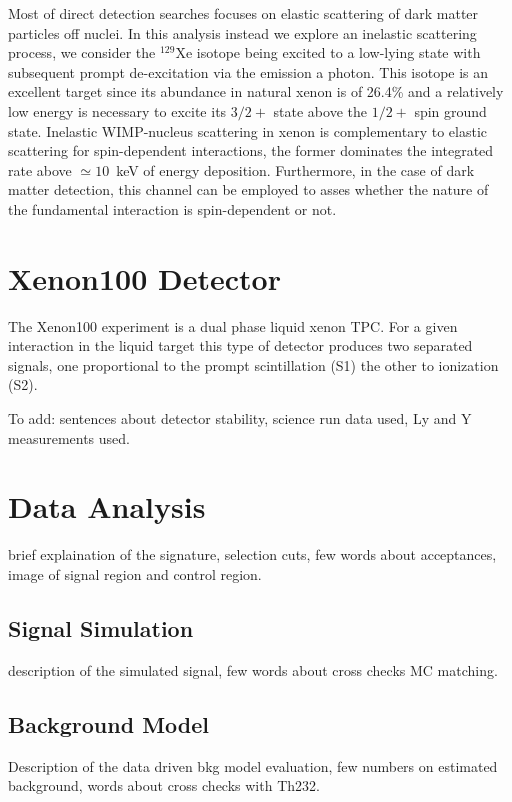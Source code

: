 \documentclass[%
 reprint,
 amsmath,amssymb,
 aps,
]{revtex4-1}
\begin{document}
Most of direct detection searches focuses on  elastic scattering of dark matter particles off nuclei.
In this analysis instead we explore an inelastic scattering process, we consider the $^{129}\text{Xe}$ isotope being excited to a low-lying state
with subsequent prompt de-excitation via the emission a photon. This isotope is an excellent target
since its abundance in natural xenon is of 26.4\% and a relatively low energy is necessary to excite its $3/2+$ state above the $1/2+$
spin ground state.
Inelastic WIMP-nucleus scattering in xenon is complementary to elastic scattering for spin-dependent interactions,
the former dominates the integrated rate above  $\simeq10$~keV of energy deposition.
Furthermore, in the case of dark matter detection, this channel can be employed to asses whether the nature of the fundamental interaction
is spin-dependent or not.

\section{Xenon100 Detector}
The Xenon100 experiment is a  dual phase liquid xenon TPC. For a given interaction in the liquid target this type of detector produces two separated signals,
one proportional to the prompt scintillation (S1) the other to ionization (S2).

To add: sentences about detector stability, science run data used, Ly and Y measurements used. 

\section{Data Analysis}

brief explaination of the signature, selection cuts, few words about acceptances, image of signal region and control region.

\subsection{Signal Simulation} 

description of the simulated signal, few words about cross checks MC matching.

\subsection {Background Model}
Description of the data driven bkg model evaluation, few numbers on estimated background, words about cross checks with Th232.
\end{document}
